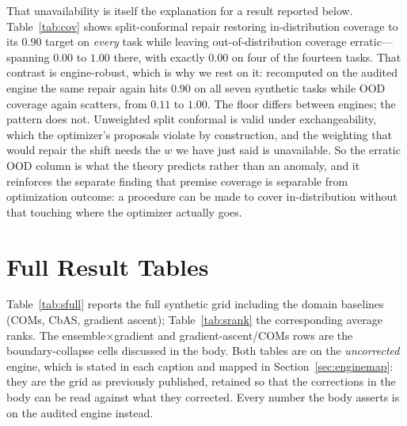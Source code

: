 \documentclass[letterpaper]{article}
\theoremstyle{plain}
\begin{document}
That unavailability is itself the explanation for a result reported below. Table~\ref{tab:cov} shows split-conformal repair restoring in-distribution coverage to its $0.90$ target on \emph{every} task while leaving out-of-distribution coverage erratic---spanning $0.00$ to $1.00$ there, with exactly $0.00$ on four of the fourteen tasks. That contrast is engine-robust, which is why we rest on it: recomputed on the audited engine the same repair again hits $0.90$ on all seven synthetic tasks while OOD coverage again scatters, from $0.11$ to $1.00$. The floor differs between engines; the pattern does not. Unweighted split conformal is valid under exchangeability, which the optimizer's proposals violate by construction, and the weighting that would repair the shift needs the $w$ we have just said is unavailable. So the erratic OOD column is what the theory predicts rather than an anomaly, and it reinforces the separate finding that premise coverage is separable from optimization outcome: a procedure can be made to cover in-distribution without that touching where the optimizer actually goes.

\section{Full Result Tables}

Table~\ref{tab:sfull} reports the full synthetic grid including the domain baselines (COMs, CbAS, gradient ascent); Table~\ref{tab:srank} the corresponding average ranks. The ensemble$\times$gradient and gradient-ascent/COMs rows are the boundary-collapse cells discussed in the body. Both tables are on the \emph{uncorrected} engine, which is stated in each caption and mapped in Section~\ref{sec:enginemap}: they are the grid as previously published, retained so that the corrections in the body can be read against what they corrected. Every number the body asserts is on the audited engine instead.
\end{document}
